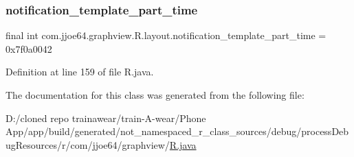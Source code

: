 \subsubsection{\texorpdfstring{notification\_template\_part\_time}{notification\_template\_part\_time}}
{\footnotesize\ttfamily final int com.\+jjoe64.\+graphview.\+R.\+layout.\+notification\+\_\+template\+\_\+part\+\_\+time = 0x7f0a0042\hspace{0.3cm}{\ttfamily [static]}}



Definition at line 159 of file R.\+java.



The documentation for this class was generated from the following file\+:\begin{DoxyCompactItemize}
\item 
D\+:/cloned repo trainawear/train-\/\+A-\/wear/\+Phone App/app/build/generated/not\+\_\+namespaced\+\_\+r\+\_\+class\+\_\+sources/debug/process\+Debug\+Resources/r/com/jjoe64/graphview/\mbox{\hyperlink{process_debug_resources_2r_2com_2jjoe64_2graphview_2_r_8java}{R.\+java}}\end{DoxyCompactItemize}
